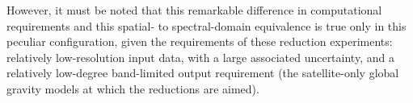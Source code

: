 \begin{subappendices}
However, it must be noted that this remarkable difference in computational requirements and this spatial- to spectral-domain equivalence is true only in this peculiar configuration, given the requirements of these reduction experiments: relatively low-resolution input data, with a large associated uncertainty, and a relatively low-degree band-limited output requirement (the satellite-only global gravity models at which the reductions are aimed).
\end{subappendices}
